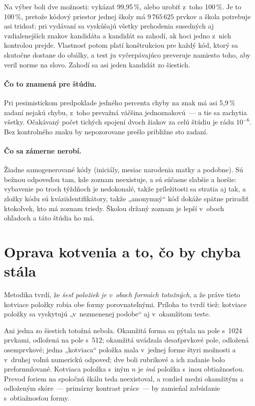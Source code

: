 Na výber boli dve možnosti: vykázať 99{,}95\,\%, alebo urobiť z~toho 100\,\%. Je
to 100\,\%, pretože kódový priestor jednej školy má $9\,765\,625$ prvkov a škola
potrebuje asi tridsať: pri vydávaní sa vyskúšajú všetky prehodenia susedných aj
vzdialenejších znakov kandidáta a kandidát sa zahodí, ak hoci jedno z~nich
kontrolou prejde. Vlastnosť potom platí konštrukciou pre každý kód, ktorý sa
skutočne dostane do obálky, a test ju vyčerpávajúco preveruje namiesto toho, aby
veril norme na slovo. Zahodí sa asi jeden kandidát zo šiestich.

\paragraph{Čo to znamená pre štúdiu.} Pri pesimistickom predpoklade jedného
percenta chyby na znak má asi 5{,}9\,\% zadaní nejakú chybu, z~toho prevažná
väčšina jednoznakovú~--- a tie sa zachytia všetky. Očakávaný počet tichých
spojení dvoch žiakov za celú štúdiu je rádu $10^{-6}$. Bez kontrolného znaku by
nepozorovane prešlo približne sto zadaní.

\paragraph{Čo sa zámerne nerobí.} Žiadne samogenerované kódy (iniciály, mesiac
narodenia matky a podobne). Sú bežnou odpoveďou tam, kde zoznam neexistuje, a sú
súčasne slabšie a horšie: vybavenie po troch týždňoch je nedokonalé, takže
príležitosti sa stratia aj tak, a zložky kódu sú kvázi\-identifikátory, takže
„anonymný“ kód dokáže spätne priradiť ktokoľvek, kto má zoznam triedy. Školou
držaný zoznam je lepší v~oboch ohľadoch a táto štúdia ho má.

\section{Oprava kotvenia a to, čo by chyba stála}
\label{sec:kotvenie-oprava}

Metodika tvrdí, že \emph{šesť položiek je v~oboch formách totožných}, a že práve
tieto kotviace položky robia obe formy porovnateľnými. Príloha to tvrdí tiež:
kotviace položky sa vyskytujú „v~nezmenenej podobe“ aj v~okamžitom teste.

Ani jedna zo šiestich totožná nebola. Okamžitá forma sa pýtala na pole s~1024
prvkami, odložená na pole s~512; okamžitá uvádzala desaťprvkové pole, odložená
osemprvkové; jedna „kotviaca“ položka mala v~jednej forme štyri možnosti a v~druhej
voľnú numerickú odpoveď; dve boli rubrikové a ich zadanie bolo preformulované.
Kotviaca položka s~iným $n$ je \emph{iná} položka s~inou obtiažnosťou. Prevod
foriem na spoločnú škálu teda neexistoval, a rozdiel medzi okamžitým a odloženým
skóre~--- primárny kontrast práce~--- by zamieňal zabúdanie s~obtiažnosťou formy.

